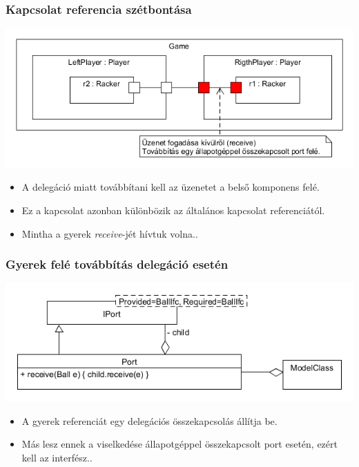 \documentclass[11pt]{beamer}
\begin{document}
\begin{frame}
	\frametitle{Kapcsolat referencia szétbontása}
	\begin{center}
	\includegraphics[scale=0.5]{vedes_demo_recived.png}
	\end{center}
	\begin{itemize}
	\item A delegáció miatt továbbítani kell az üzenetet a belső komponens felé.
	\item Ez a kapcsolat azonban különbözik az általános kapcsolat referenciától.
	\item Mintha a gyerek \textit{receive}-jét hívtuk volna..
	\end{itemize}
\end{frame}

\begin{frame}
	\frametitle{Gyerek felé továbbítás delegáció esetén}
	\begin{center}
	\includegraphics[scale=0.5]{vedes_demo_notbehav_port.png}
	\end{center}
	\begin{itemize}
	\item A gyerek referenciát egy delegációs összekapcsolás állítja be.
	\item Más lesz ennek a viselkedése állapotgéppel összekapcsolt port esetén, ezért kell az interfész..
	\end{itemize}
\end{frame}
\end{document}
